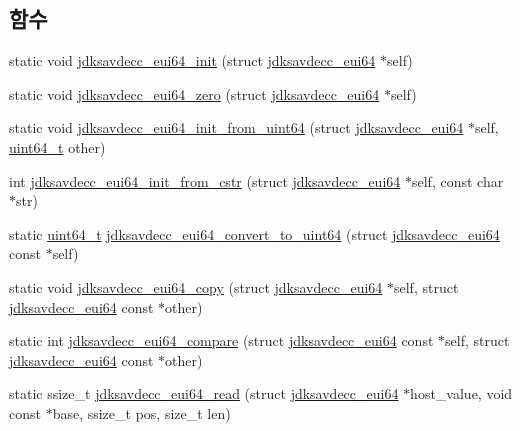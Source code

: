 \subsection*{함수}
\begin{DoxyCompactItemize}
\item 
static void \hyperlink{group__eui64_ga6eda4ed21b6f0d526b180ac633eeba69}{jdksavdecc\+\_\+eui64\+\_\+init} (struct \hyperlink{structjdksavdecc__eui64}{jdksavdecc\+\_\+eui64} $\ast$self)
\item 
static void \hyperlink{group__eui64_ga76a16e97cddd2d25f0b28c3ddbbb1e87}{jdksavdecc\+\_\+eui64\+\_\+zero} (struct \hyperlink{structjdksavdecc__eui64}{jdksavdecc\+\_\+eui64} $\ast$self)
\item 
static void \hyperlink{group__eui64_gae410f4c2dc9cbd68690e1a09912ee4f3}{jdksavdecc\+\_\+eui64\+\_\+init\+\_\+from\+\_\+uint64} (struct \hyperlink{structjdksavdecc__eui64}{jdksavdecc\+\_\+eui64} $\ast$self, \hyperlink{parse_8c_aec6fcb673ff035718c238c8c9d544c47}{uint64\+\_\+t} other)
\item 
int \hyperlink{group__eui64_ga5331dac65cac162a295a9c4aaabed730}{jdksavdecc\+\_\+eui64\+\_\+init\+\_\+from\+\_\+cstr} (struct \hyperlink{structjdksavdecc__eui64}{jdksavdecc\+\_\+eui64} $\ast$self, const char $\ast$str)
\item 
static \hyperlink{parse_8c_aec6fcb673ff035718c238c8c9d544c47}{uint64\+\_\+t} \hyperlink{group__eui64_ga1c9a3634faa4bec90dea5a52e691bf63}{jdksavdecc\+\_\+eui64\+\_\+convert\+\_\+to\+\_\+uint64} (struct \hyperlink{structjdksavdecc__eui64}{jdksavdecc\+\_\+eui64} const $\ast$self)
\item 
static void \hyperlink{group__eui64_ga1a58a18fd6340135c43a2c6a91ff0c56}{jdksavdecc\+\_\+eui64\+\_\+copy} (struct \hyperlink{structjdksavdecc__eui64}{jdksavdecc\+\_\+eui64} $\ast$self, struct \hyperlink{structjdksavdecc__eui64}{jdksavdecc\+\_\+eui64} const $\ast$other)
\item 
static int \hyperlink{group__eui64_ga1d7414dc665866d8ad0af100f8a52ef2}{jdksavdecc\+\_\+eui64\+\_\+compare} (struct \hyperlink{structjdksavdecc__eui64}{jdksavdecc\+\_\+eui64} const $\ast$self, struct \hyperlink{structjdksavdecc__eui64}{jdksavdecc\+\_\+eui64} const $\ast$other)
\item 
static ssize\+\_\+t \hyperlink{group__eui64_ga7c7ee5c2d293106f4d997affcbc3ef15}{jdksavdecc\+\_\+eui64\+\_\+read} (struct \hyperlink{structjdksavdecc__eui64}{jdksavdecc\+\_\+eui64} $\ast$host\+\_\+value, void const $\ast$base, ssize\+\_\+t pos, size\+\_\+t len)
\item 

\end{DoxyCompactItemize}
